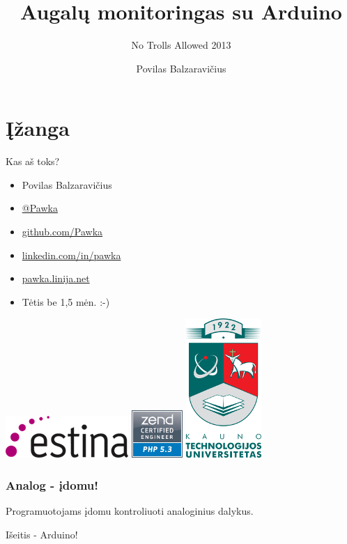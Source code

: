 \documentclass[12pt,a4paper]{beamer}
\author{Povilas Balzaravičius}
\title{Augalų monitoringas su Arduino}
\subtitle{No Trolls Allowed 2013}
\begin{document}
\section{Įžanga}
\begin{frame}
	\titlepage
\end{frame}

\begin{frame}{Kas aš toks?}
    \begin{itemize}
        \item Povilas Balzaravičius
        \item \href{https://twitter.com/Pawka}{@Pawka}
        \item \href{https://github.com/Pawka}{github.com/Pawka}
        \item \href{https://linkedin.com/in/pawka}{linkedin.com/in/pawka}
        \item \href{http://pawka.linija.net}{pawka.linija.net}
        \item Tėtis be 1,5 mėn. :-)
    \end{itemize}
    \begin{center}
        \includegraphics[scale=0.4]{img/estina.png}
        \hskip1.5cm
        \includegraphics[scale=0.4]{img/zce.png}
        \hskip1.5cm
        \includegraphics[scale=0.75]{img/ktu.png}
    \end{center}
\end{frame}

\begin{frame}
    \frametitle{Analog - įdomu!}

    \begin{center}
        Programuotojams įdomu kontroliuoti analoginius dalykus.
    \end{center}
    \pause
    \begin{center}
        {\Huge Išeitis - Arduino!}
    \end{center}

\end{frame}
\end{document}
